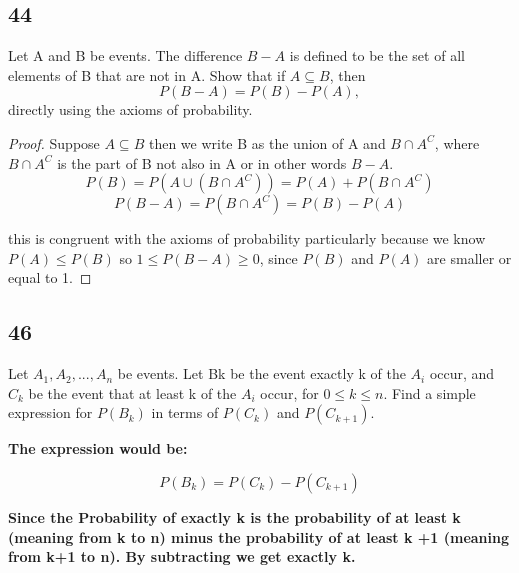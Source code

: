 \documentclass{article}
\begin{document}
\subsection{44}
 Let A and B be events. The diﬀerence $B -A$ is deﬁned to be the set of all elements of B that are not in A. Show that if $A \subseteq B$, then $$P(B - A) = P(B) - P(A),$$ directly using the axioms of probability.


 \begin{proof}
 Suppose $A \subseteq B$ then we write B as the union of  A and $B  \cap A^C$, where $B \cap A ^C$ is the part of B not also in A or in other words $B -A$. 
     $$P(B)= P(A \cup ( B  \cap A ^ C))= P(A) + P (B \cap A ^C)$$
    $$ P (B -A) = P (B  \cap A ^C) = P (B) - P (A)$$

    this is congruent with the axioms of probability particularly because we know $P (A) \leq P (B)$ so $ 1 \leq P(B-A) \geq 0$, since $P(B)$ and $P(A)$ are smaller or equal to 1.
     
 \end{proof}
\subsection{46}
 Let $A_1,A_2,...,A_n$ be events. Let Bk be the event exactly k of the $A_i$ occur, and $C_k$ be the event that at least k of the $A_i$ occur, for $0 \leq k \leq n$. Find a simple expression for $P(B_k)$ in terms of $P(C_k)$ and $P(C_{k+1})$.

\textbf{The expression would be: }

$$P(B_k)=P(C_k)-P(C_{k+1})$$

\textbf{Since the Probability of exactly k is the probability of at least k (meaning from k to n) minus the probability of at least k +1 (meaning from k+1 to n). By subtracting we get exactly k.}
\end{document}
